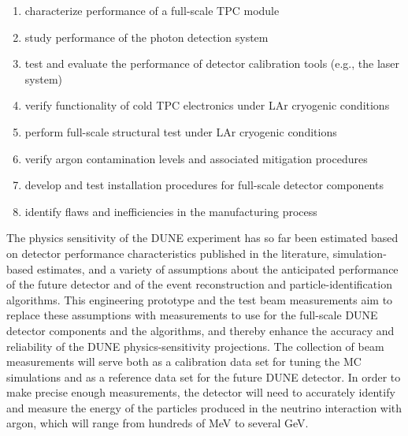  \begin{enumerate}
 \item characterize performance of a full-scale TPC module
 \item study performance of the photon detection system
 \item test and evaluate the performance of detector calibration tools (e.g., the laser system)
  \item verify functionality of cold TPC electronics under LAr cryogenic conditions
  \item perform full-scale structural test under LAr cryogenic conditions
  \item verify argon contamination levels and associated mitigation procedures
  \item develop and test installation procedures for full-scale detector components
  \item identify flaws and inefficiencies in the manufacturing process
\end{enumerate}



The physics sensitivity of the DUNE experiment has so far been estimated based on detector performance characteristics published in the literature, simulation-based estimates, and %
a variety of assumptions about the anticipated performance of the future detector and of the event reconstruction and particle-identification algorithms.
This engineering prototype and the test beam measurements aim to replace these assumptions with measurements to use for the full-scale DUNE detector components and the algorithms, %
and thereby %
enhance the accuracy and reliability of the DUNE physics-sensitivity projections.
The collection of beam measurements will serve both as a calibration data set for tuning the MC simulations and %
as a reference data set for %
the future DUNE detector. 
%
In order to make %
precise enough measurements, the  detector will need to accurately identify and measure the energy of the particles produced in the neutrino interaction with argon, which will range from hundreds of MeV to several GeV.

